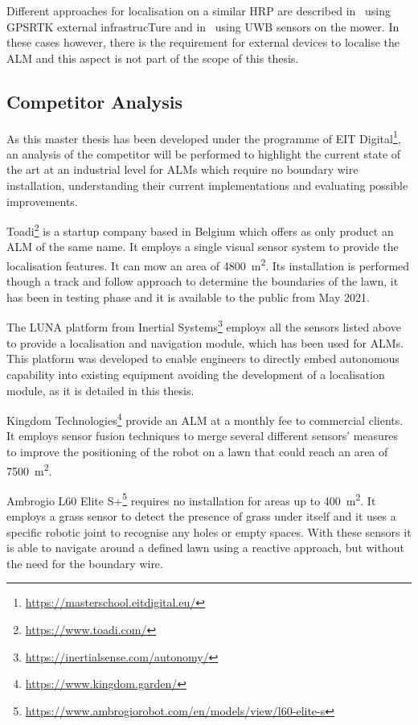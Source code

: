 Different approaches for localisation on a similar \gls{HRP} are described in~\cite{oden_localization_2017} using \gls{GPSRTK} external infrastrucTure and in~\cite{lensund_local_2018} using \gls{UWB} sensors on the mower.
In these cases however, there is the requirement for external devices to localise the \gls{ALM} and this aspect is not part of the scope of this thesis.


\subsection{Competitor Analysis}

\noindent As this master thesis has been developed under the programme of EIT Digital\footnote{\url{https://masterschool.eitdigital.eu/}}, an analysis of the competitor will be performed to highlight the current state of the art at an industrial level for \glspl{ALM} which require no boundary wire installation, understanding their current implementations and evaluating possible improvements.

Toadi\footnote{\url{https://www.toadi.com/}} is a startup company based in Belgium which offers as only product an \gls{ALM} of the same name. It employs a single visual sensor system to provide the localisation features. It can mow an area of \SI{4800}{\meter\squared}.
Its installation is performed though a track and follow approach to determine the boundaries of the lawn, it has been in testing phase and it is available to the public from May 2021.

The LUNA platform from Inertial Systems\footnote{\url{https://inertialsense.com/autonomy/}} employs all the sensors listed above to provide a localisation and navigation module, which has been used for \glspl{ALM}. This platform was developed to enable engineers to directly embed autonomous capability into existing equipment avoiding the development of a localisation module, as it is detailed in this thesis.

Kingdom Technologies\footnote{\url{https://www.kingdom.garden/}} provide an \gls{ALM} at a monthly fee to commercial clients.
It employs sensor fusion techniques to merge several different sensors' measures to improve the positioning of the robot on a lawn that could reach an area of \SI{7500}{\meter\squared}.

Ambrogio L60 Elite S+\footnote{\url{https://www.ambrogiorobot.com/en/models/view/l60-elite-s}} requires no installation for areas up to \SI{400}{\meter\squared}.
It employs a grass sensor to detect the presence of grass under itself and it uses a specific robotic joint to recognise any holes or empty spaces. With these sensors it is able to navigate around a defined lawn using a reactive approach, but without the need for the boundary wire.

